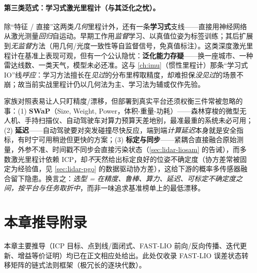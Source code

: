 \paragraph{第三类范式：学习式激光里程计（与其泛化之忧）。}
除“特征 / 直接”这两类\emph{几何}里程计外，还有一条\textbf{学习式}支线——直接用神经网络从激光测量\emph{回归}自运动\cite{carlone2026handbook}。早期工作用\emph{监督}学习、以真值位姿为标签训练；其后扩展到\emph{无监督}方法（用几何/光度一致性等自监督信号，免真值标注）。这类深度激光里程计在基准上表现可观，但有一个公认隐忧：\textbf{泛化能力存疑}——换一座城市、一种雷达线数、一类天气，模型未必还准。这与 \cref{ch:imu}（惯性里程计）那条“学习式 IO”线\emph{呼应}：学习方法擅长在\emph{见过}的分布里榨取精度，却难担保\emph{没见过}的场景不崩；故当前实战里程计仍以几何法为主、学习法为辅或仅作先验。

\begin{insight}
家族对照表易让人只盯精度/漂移，但部署到真实平台还须权衡三件常被忽略的事\cite{carlone2026handbook}：(1) \textbf{SWaP}（Size, Weight, Power，体积-重量-功耗）——森林穿梭的微型无人机、手持扫描仪、自动驾驶车对算力预算天差地别，最准最重的系统未必可用；(2) \textbf{延迟}——自动驾驶要对突发碰撞尽快反应，端到端\emph{计算延迟}本身就是安全指标，有时宁可用稍逊但更快的方案；(3) \textbf{标定与同步}——紧耦合直接融合原始测量，外参不准、时间戳不同步会直接污染状态（\cref{sec:lidar-liosam} 的告诫），而多数激光里程计依赖 ICP，却\emph{不}天然给出标定良好的位姿不确定度（协方差常被固定为经验值，见 \cref{sec:lidar-pgo} 的数据驱动协方差），这给下游的概率多传感器融合留下隐患。换言之：\emph{选型 = 在精度、鲁棒、算力、延迟、可标定不确定度之间，按平台与任务取折中}，而非一味追求基准榜单上的最低漂移。
\end{insight}

\section{本章推导附录}
\label{sec:lidar-appendix}

本章主要推导（ICP 目标、点到线/面闭式、FAST-LIO 前向/反向传播、迭代更新、增益等价证明）均已在正文相应处给出。此处仅收录 FAST-LIO 误差状态转移矩阵的链式法则框架（极冗长的逐块代数）。

